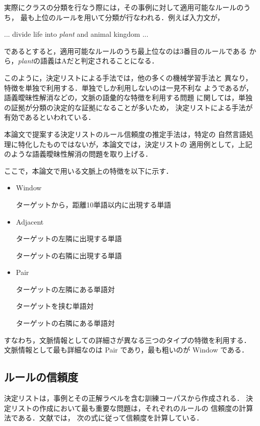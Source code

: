 実際にクラスの分類を行なう際には，その事例に対して適用可能なルールのうち，
最も上位のルールを用いて分類が行なわれる．例えば入力文が，
\begin{center}
... divide life into {\it plant} and animal kingdom ...
\end{center}
\noindent
であるとすると，適用可能なルールのうち最上位なのは3番目のルールである
から，{\it plant}の語義はAだと判定されることになる．

このように，決定リストによる手法では，他の多くの機械学習手法と
異なり，特徴を単独で利用する．単独でしか利用しないのは一見不利な
ようであるが，語義曖昧性解消などの，文脈の語彙的な特徴を利用する問題
に関しては，単独の証拠が分類の決定的な証拠になることが多いため，
決定リストによる手法が有効であるといわれている．

本論文で提案する決定リストのルール信頼度の推定手法は，特定の
自然言語処理に特化したものではないが，本論文では，決定リストの
適用例として，上記のような語義曖昧性解消の問題を取り上げる．

ここで，本論文で用いる文脈上の特徴を以下に示す．

\begin{itemize}
\item{Window}

ターゲットから，距離10単語以内に出現する単語

\item{Adjacent}

ターゲットの左隣に出現する単語

ターゲットの右隣に出現する単語

\item{Pair}

ターゲットの左隣にある単語対

ターゲットを挟む単語対

ターゲットの右隣にある単語対

\end{itemize}
\vspace{3mm}
すなわち，文脈情報としての詳細さが異なる三つのタイプの特徴を利用する．
文脈情報として最も詳細なのは  Pair であり，最も粗いのが Window である．

\subsection{ルールの信頼度}

決定リストは，事例とその正解ラベルを含む訓練コーパスから作成される．
決定リストの作成において最も重要な問題は，それぞれのルールの
信頼度の計算法である．文献\cite{Yarowsky:Decision}では，
次の式に従って信頼度を計算している．

